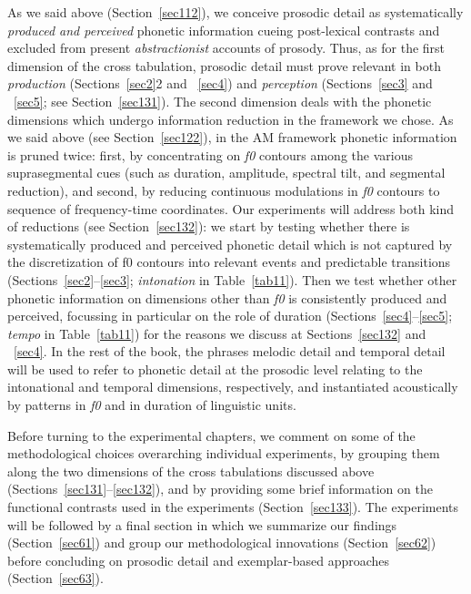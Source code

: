 As we said above (Section~\ref{sec112}), we conceive prosodic detail as systematically \textit{produced and perceived} phonetic information cueing post-lexical contrasts and excluded from present \textit{abstractionist} accounts of prosody. Thus, as for the first dimension of the cross tabulation, prosodic detail must prove relevant in both \textit{production} (Sections~\ref{sec2}2 and ~\ref{sec4}) and \textit{perception} (Sections~\ref{sec3} and ~\ref{sec5}; see Section~\ref{sec131}). The second dimension deals with the phonetic dimensions which undergo information reduction in the framework we chose. As we said above (see Section~\ref{sec122}), in the AM framework phonetic information is pruned twice: first, by concentrating on \textit{f0} contours among the various suprasegmental cues (such as duration, amplitude, spectral tilt, and segmental reduction), and second, by reducing continuous modulations in \textit{f0} contours to sequence of frequency-time coordinates. Our experiments will address both kind of reductions (see Section~\ref{sec132}): we start by testing whether there is systematically produced and perceived phonetic detail which is not captured by the discretization of f0 contours into relevant events and predictable transitions (Sections~\ref{sec2}--\ref{sec3}; \textit{intonation} in Table~\ref{tab11}). Then we test whether other phonetic information on dimensions other than \textit{f0} is consistently produced and perceived, focussing in particular on the role of duration (Sections~\ref{sec4}--\ref{sec5}; \textit{tempo} in Table~\ref{tab11}) for the reasons we discuss at Sections~\ref{sec132} and ~\ref{sec4}. In the rest of the book, the phrases melodic detail and temporal detail will be used to refer to phonetic detail at the prosodic level relating to the intonational and temporal dimensions, respectively, and instantiated acoustically by patterns in \textit{f0} and in duration of linguistic units.

Before turning to the experimental chapters, we comment on some of the methodological choices overarching individual experiments, by grouping them along the two dimensions of the cross tabulations discussed above (Sections~\ref{sec131}--\ref{sec132}), and by providing some brief information on the functional contrasts used in the experiments (Section~\ref{sec133}). The experiments will be followed by a final section in which we summarize our findings (Section~\ref{sec61}) and group our methodological innovations (Section~\ref{sec62}) before concluding on prosodic detail and exemplar-based approaches (Section~\ref{sec63}).

